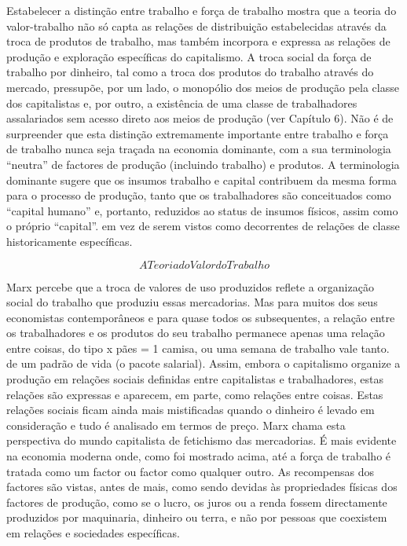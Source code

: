  \par 
Estabelecer a distinção entre trabalho e força de trabalho mostra que a teoria do valor-trabalho não só capta as relações de distribuição estabelecidas através da troca de produtos de trabalho, mas também incorpora e expressa as relações de produção e exploração específicas do capitalismo. A troca social da força de trabalho por dinheiro, tal como a troca dos produtos do trabalho através do mercado, pressupõe, por um lado, o monopólio dos meios de produção pela classe dos capitalistas e, por outro, a existência de uma classe de trabalhadores assalariados sem acesso direto aos meios de produção (ver Capítulo {\color{blue}6}). Não é de surpreender que esta distinção extremamente importante entre trabalho e força de trabalho nunca seja traçada na economia dominante, com a sua terminologia “neutra” de factores de produção (incluindo trabalho) e produtos. A terminologia dominante sugere que os insumos trabalho e capital contribuem da mesma forma para o processo de produção, tanto que os trabalhadores são conceituados como “capital humano” e, portanto, reduzidos ao status de insumos físicos, assim como o próprio “capital”. em vez de serem vistos como decorrentes de relações de classe historicamente específicas.
 \par 
\[A Teoria do Valor do Trabalho\]
 \par 
Marx percebe que a troca de valores de uso produzidos reflete a organização social do trabalho que produziu essas mercadorias. Mas para muitos dos seus economistas contemporâneos e para quase todos os subsequentes, a relação entre os trabalhadores e os produtos do seu trabalho permanece apenas uma relação entre coisas, do tipo x pães = {\color{blue}1} camisa, ou uma semana de trabalho vale tanto. de um padrão de vida (o pacote salarial). Assim, embora o capitalismo organize a produção em relações sociais definidas entre capitalistas e trabalhadores, estas relações são expressas e aparecem, em parte, como relações entre coisas. Estas relações sociais ficam ainda mais mistificadas quando o dinheiro é levado em consideração e tudo é analisado em termos de preço. Marx chama esta perspectiva do mundo capitalista de fetichismo das mercadorias. É mais evidente na economia moderna onde, como foi mostrado acima, até a força de trabalho é tratada como um factor ou factor como qualquer outro. As recompensas dos factores são vistas, antes de mais, como sendo devidas às propriedades físicas dos factores de produção, como se o lucro, os juros ou a renda fossem directamente produzidos por maquinaria, dinheiro ou terra, e não por pessoas que coexistem em relações e sociedades específicas.

